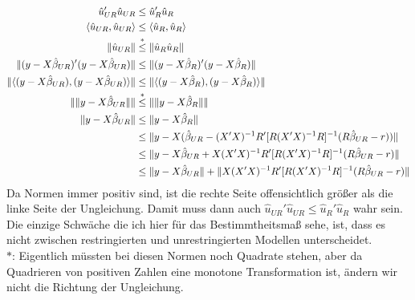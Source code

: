 \documentclass{article}
\begin{document}
	\begin{align}
		\hat{u}_{UR}'\hat{u}_{UR} &\le \hat{u}_R'\hat{u}_R \notag \\
		\langle \hat{u}_{UR},\hat{u}_{UR}\rangle &\le \langle \hat{u}_R,\hat{u}_R\rangle \notag \\
		\Vert \hat{u}_{UR}\Vert &\overset{\ast}{\le} \Vert \hat{u}_R\hat{u}_R\Vert \notag \\
		\Vert (y-X\hat{\beta}_{UR})'(y-X\hat{\beta}_{UR})\Vert &\le \Vert (y-X\hat{\beta}_R)'(y-X\hat{\beta}_R)\Vert \notag \\
		\Vert \langle (y-X\hat{\beta}_{UR}),(y-X\hat{\beta}_{UR})\rangle\Vert &\le \Vert \langle (y-X\hat{\beta}_{R}),(y-X\hat{\beta}_{R})\rangle\Vert \notag \\
		\Vert \Vert y-X\hat{\beta}_{UR}\Vert\Vert &\overset{\ast}{\le} \Vert \Vert y-X\hat{\beta}_R\Vert\Vert \notag \\
		\Vert y-X\hat{\beta}_{UR}\Vert &\le \Vert y-X\hat{\beta}_R\Vert \notag \\
		&\le \Vert y-X(\hat{\beta}_{UR} - (X'X)^{-1}R'[R(X'X)^{-1}R]^{-1}(R\hat{\beta}_{UR}-r))\Vert \notag \\
		&\le \Vert y-X\hat{\beta}_{UR} + X(X'X)^{-1}R'[R(X'X)^{-1}R]^{-1}(R\hat{\beta}_{UR}-r) \Vert \notag \\
		&\le \Vert y-X\hat{\beta}_{UR}\Vert + \Vert X(X'X)^{-1}R'[R(X'X)^{-1}R]^{-1}(R\hat{\beta}_{UR}-r) \Vert \notag
	\end{align}
	Da Normen immer positiv sind, ist die rechte Seite offensichtlich größer als die linke Seite der Ungleichung. Damit muss dann auch $\hat{u}_{UR}'\hat{u}_{UR} \le \hat{u}_R'\hat{u}_R$ wahr sein. Die einzige Schwäche die ich hier für das Bestimmtheitsmaß sehe, ist, dass es nicht zwischen restringierten und unrestringierten Modellen unterscheidet. \\
	$\ast$: Eigentlich müssten bei diesen Normen noch Quadrate stehen, aber da Quadrieren von positiven Zahlen eine monotone Transformation ist, ändern wir nicht die Richtung der Ungleichung.
	
\end{document}
